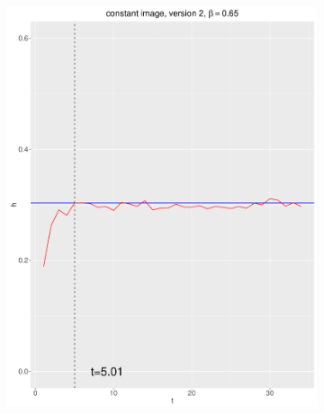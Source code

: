 \documentclass[12pt, oneside]{article}   	%
\begin{document}
\begin{figure}[H]
        \centering
        \begin{subfigure}[b]{0.475\textwidth}
            \centering
            \includegraphics[width=\textwidth, height=0.32\textheight]{const_v2_65.pdf}
        \end{subfigure}
        \quad
        \begin{subfigure}[b]{0.475\textwidth}
            \centering

\end{subfigure}
\end{figure}
\end{document}
